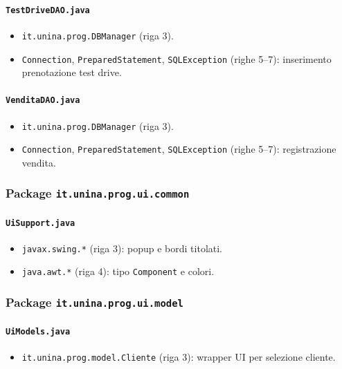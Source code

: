 \documentclass[12pt,a4paper]{article}
\begin{document}
\paragraph{\texttt{TestDriveDAO.java}}
\begin{itemize}
  \item \texttt{it.unina.prog.DBManager} (riga 3).
  \item \texttt{Connection}, \texttt{PreparedStatement}, \texttt{SQLException} (righe 5--7): inserimento prenotazione test drive.
\end{itemize}

\paragraph{\texttt{VenditaDAO.java}}
\begin{itemize}
  \item \texttt{it.unina.prog.DBManager} (riga 3).
  \item \texttt{Connection}, \texttt{PreparedStatement}, \texttt{SQLException} (righe 5--7): registrazione vendita.
\end{itemize}

\subsubsection*{Package \texttt{it.unina.prog.ui.common}}
\paragraph{\texttt{UiSupport.java}}
\begin{itemize}
  \item \texttt{javax.swing.*} (riga 3): popup e bordi titolati.
  \item \texttt{java.awt.*} (riga 4): tipo \texttt{Component} e colori.
\end{itemize}

\subsubsection*{Package \texttt{it.unina.prog.ui.model}}
\paragraph{\texttt{UiModels.java}}
\begin{itemize}
  \item \texttt{it.unina.prog.model.Cliente} (riga 3): wrapper UI per selezione cliente.
\end{itemize}
\end{document}
